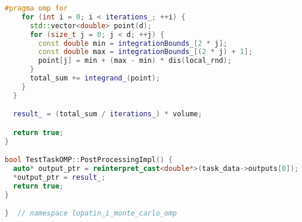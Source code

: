 \documentclass[12pt,a4paper]{extarticle}
\begin{document}
\begin{lstlisting}[language=C++]
#pragma omp for
    for (int i = 0; i < iterations_; ++i) {
      std::vector<double> point(d);
      for (size_t j = 0; j < d; ++j) {
        const double min = integrationBounds_[2 * j];
        const double max = integrationBounds_[(2 * j) + 1];
        point[j] = min + (max - min) * dis(local_rnd);
      }
      total_sum += integrand_(point);
    }
  }

  result_ = (total_sum / iterations_) * volume;

  return true;
}

bool TestTaskOMP::PostProcessingImpl() {
  auto* output_ptr = reinterpret_cast<double*>(task_data->outputs[0]);
  *output_ptr = result_;
  return true;
}

}  // namespace lopatin_i_monte_carlo_omp
\end{lstlisting}
\end{document}

